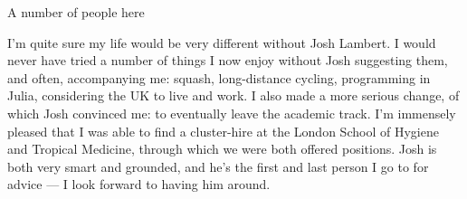 A number of people here 

I'm quite sure my life would be very different without Josh Lambert.
I would never have tried a number of things I now enjoy without Josh suggesting them, and often, accompanying me: squash, long-distance cycling, programming in Julia, considering the UK to live and work.
I also made a more serious change, of which Josh convinced me: to eventually leave the academic track.
I'm immensely pleased that I was able to find a cluster-hire at the London School of Hygiene and Tropical Medicine, through which we were both offered positions.
Josh is both very smart and grounded, and he's the first and last person I go to for advice --- I look forward to having him around.

\endgroup
